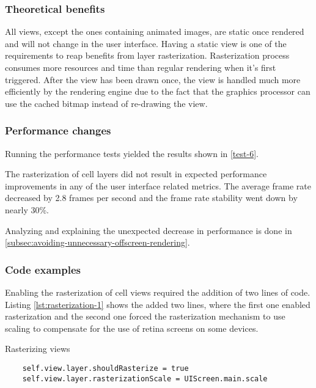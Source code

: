 \documentclass[a4paper,12pt]{article}
\begin{document}
\subsubsection{Theoretical benefits}
All views, except the ones containing animated images, are static once rendered and will not change in the user interface. Having a static view is one of the requirements to reap benefits from layer rasterization. Rasterization process consumes more resources and time than regular rendering when it's first triggered. After the view has been drawn once, the view is handled much more efficiently by the rendering engine due to the fact that the graphics processor can use the cached bitmap instead of re-drawing the view.\cite{MovingPixelsOntoTheScreen}

\subsubsection{Performance changes}
Running the performance tests yielded the results shown in \autoref{test-6}.

The rasterization of cell layers did not result in expected performance improvements in any of the user interface related metrics. The average frame rate decreased by 2.8 frames per second and the frame rate stability went down by nearly 30\%.

Analyzing and explaining the unexpected decrease in performance is done in \autoref{subsec:avoiding-unnecessary-offscreen-rendering}.

\subsubsection{Code examples}
Enabling the rasterization of cell views required the addition of two lines of code. Listing \ref{lst:rasterization-1} shows the added two lines, where the first one enabled rasterization and the second one forced the rasterization mechanism to use scaling to compensate for the use of retina screens on some devices.
\begin{listing}[H]
  \caption{Rasterizing views}
  \label{lst:rasterization-1}
  \begin{verbatim}
    self.view.layer.shouldRasterize = true
    self.view.layer.rasterizationScale = UIScreen.main.scale
  \end{verbatim}
\end{listing}
\end{document}
